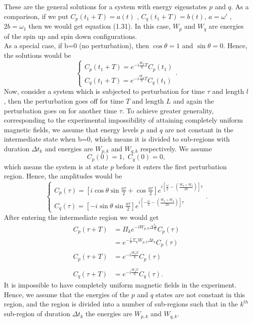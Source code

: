 These are the general solutions for a system with energy eigenstates
$p$ and $q$. As a comparison, if we put $C_p(t_1+T)=a(t)$ ,
$C_q(t_1+T)=b(t)$, $a= \omega'$ , $2b=\omega_1$ then we would get
equation (1.31). In this case, $W_p$ and $W_q$ are energies of the
spin up and spin down configurations.
\\
As a special case, if b=0 (no perturbation), then $\cos \theta=1$ and
$\sin \theta=0$. Hence, the solutions would be
\begin{equation}
\left\lbrace
\begin{array}{c}
C_p(t_1+T)= e^{-i \frac{W_p}{\hbar} T} C_p(t_1) \\
C_q(t_1+T)=e^{-i \frac{W_q}{\hbar}T} C_q(t_1)
\end{array}
\right. .
\end{equation}
%
Now, consider a system which is subjected to perturbation for time
$\tau$ and length $l$, then the perturbation goes off for time $T$ and
length $L$ and again the perturbation goes on for another time
$\tau$. To achieve greater generality, corresponding to the
experimental impossibility of attaining completely uniform magnetic
fields, we assume that energy levels $p$ and $q$ are not constant in
the intermediate state when b=0, which means it is divided to
sub-regions with duration $\Delta t_k$ and energies are $W_{p,k}$ and
$W_{q,k}$ respectively. We assume
\begin{equation}
C_p(0)=1 , \, \, C_q(0)=0 ,
\end{equation}
which means the system is at state $p$ before it enters the first
perturbation region. Hence, the amplitudes would be
\begin{equation}
\left\lbrace
\begin{array}{c}
C_p(\tau)=\left[i \cos \theta \sin \frac{a\tau}{2}+ \cos \frac{a\tau}{2}\right]
e^{i\left[\frac{\omega}{2}-\left(\frac{W_p+W_q}{2\hbar}\right)\right]\tau}\\
C_q(\tau)=\left[ -i \sin \theta \sin \frac{a\tau}{2} \right] 
e^{i \left[ -\frac{\omega}{2} - \left( \frac{W_p+W_q}{2\hbar}\right)\right]\tau}
\end{array}\right. .
\end{equation}
After entering the intermediate region we would get
\begin{align}
C_p(\tau+T)&=\Pi_k e^{-i W_{p,k} \Delta \frac{t_k}{\hbar}}  C_p(\tau)\nonumber \\
&=e^{-\frac{i}{\hbar} \Sigma_k W_{p,k} \Delta t_k}  C_p(\tau) \nonumber\\
C_p(\tau+T)&=e^{-i \frac{\bar{W_p}T}{\hbar}} C_p(\tau) \\
\nonumber\\
C_q(\tau+T)&=e^{-i \frac{\bar{W_q}T}{\hbar}} C_q(\tau) .
\end{align}
%
It is impossible to have completely uniform magnetic fields in the
experiment. Hence, we assume that the energies of the $p$ and $q$
states are not constant in this region, and the region is divided into
a number of sub-regions such that in the $k^{th}$ sub-region of
duration $\Delta t_k$ the energies are $W_{p,k}$ and $W_{q,k}$.

